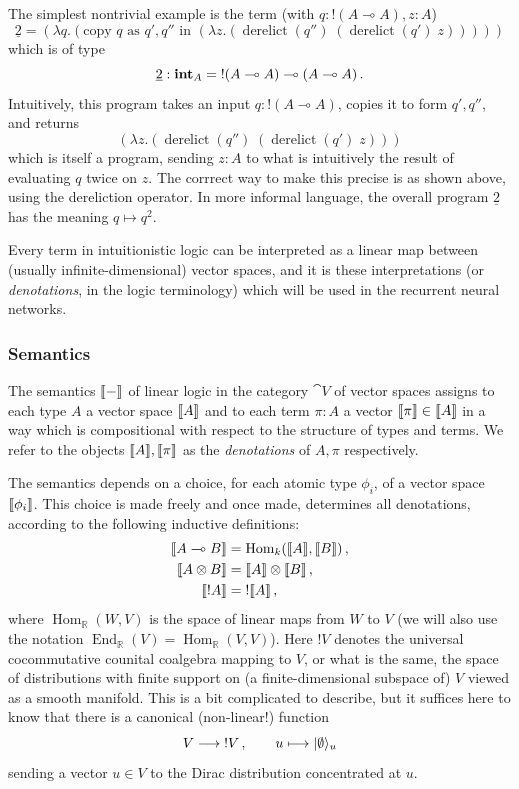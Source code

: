 \documentclass[english,letter paper,12pt,leqno]{article}
\theoremstyle{example}
\numberwithin{equation}{section}
\def\Hom{\operatorname{Hom}}
\def\be{\begin{equation}}
\def\ee{\end{equation}}
\DeclareMathOperator{\End}{End}
\DeclareMathOperator{\derelict}{derelict}
\begin{document}
The simplest nontrivial example is the term (with $q:{!}(A \multimap A), z: A$)
\be\label{eq:church_2_linearlambda}
\underline{2} = (\lambda q.(\textrm{copy $q$ as $q',q''$ in } (\lambda z. (\derelict(q'') \; (\derelict(q')\; z)))))
\ee
which is of type 
\[
\underline{2}: \textbf{int}_A = {!}(A \multimap A) \multimap (A \multimap A)\,.
\]
Intuitively, this program takes an input $q: {!}(A \multimap A)$, copies it to form $q',q''$, and returns
\[
(\lambda z. (\derelict(q'') \; (\derelict(q')\; z)))
\]
which is itself a program, sending $z:A$ to what is intuitively the result of evaluating $q$ twice on $z$. The corrrect way to make this precise is as shown above, using the dereliction operator. In more informal language, the overall program $\underline{2}$ has the meaning $q \longmapsto q^2$.

Every term in intuitionistic logic can be interpreted as a linear map between (usually infinite-dimensional) vector spaces, and it is these interpretations (or \emph{denotations}, in the logic terminology) which will be used in the recurrent neural networks.

\subsubsection{Semantics}

The semantics $\llbracket - \rrbracket$ of linear logic in the category $\cat{V}$ of vector spaces \cite[\S 5.1, \S 5.3]{murfet_ll} assigns to each type $A$ a vector space $\llbracket A \rrbracket$ and to each term $\pi: A$ a vector $\llbracket \pi \rrbracket \in \llbracket A \rrbracket$ in a way which is compositional with respect to the structure of types and terms. We refer to the objects $\llbracket A \rrbracket, \llbracket \pi \rrbracket$ as the \emph{denotations} of $A,\pi$ respectively. 

The semantics depends on a choice, for each atomic type $\phi_i$, of a vector space $\llbracket \phi_i \rrbracket$. This choice is made freely and once made, determines all denotations, according to the following inductive definitions:
\begin{align*}
\den{A \multimap B} &= \Hom_k(\den{A},\den{B})\,,\\
\den{A \otimes B} &= \den{A} \otimes \den{B}\,,\\
\den{{!}A} &= {!} \den{A}\,,
\end{align*}
where $\Hom_{\mathbb{R}}(W,V)$ is the space of linear maps from $W$ to $V$ (we will also use the notation $\End_{\mathbb{R}}(V) = \Hom_{\mathbb{R}}(V,V)$). Here ${!} V$ denotes the universal cocommutative counital coalgebra mapping to $V$, or what is the same, the space of distributions with finite support on (a finite-dimensional subspace of) $V$ viewed as a smooth manifold. This is a bit complicated to describe, but it suffices here to know that there is a canonical (non-linear!) function
\be\label{eq:vtobangv}
V \lto {!} V\,, \qquad u \longmapsto \ket{\emptyset}_u
\ee
sending a vector $u \in V$ to the Dirac distribution concentrated at $u$.
\end{document}
